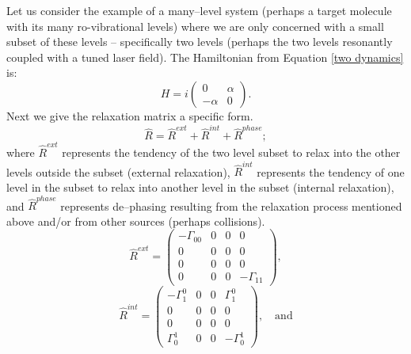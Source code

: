 Let us consider the example of a many--level system (perhaps a target molecule with its many ro-vibrational levels) where we are only concerned with a small subset of these levels -- specifically two levels (perhaps the two levels resonantly coupled with a tuned laser field). The Hamiltonian from Equation \ref{two dynamics} is:
\begin{equation}
H
=
i\left(
\begin{array}{cc}
0 & \alpha \\
-\alpha & 0
\end{array}
\right).
\label{Hilbert}
\end{equation}
Next we give the relaxation matrix a specific form.
\begin{equation}
\hat{R}
=
\hat{R}^{ext}
+
\hat{R}^{int}
+
\hat{R}^{phase};
\label{R}
\end{equation}
where $\hat{R}^{ext}$ represents the tendency of the two level subset to relax into the other levels outside the subset (external relaxation), $\hat{R}^{int}$ represents the tendency of one level in the subset to relax into another level in the subset (internal relaxation), and $\hat{R}^{phase}$ represents de--phasing resulting from the relaxation process mentioned above and/or from other sources (perhaps collisions).
\begin{equation}
\hat{R}^{ext}
=
\left(
\begin{array}{cccc}
-\Gamma_{00} & 0 & 0 & 0 \\
0 & 0 & 0 & 0 \\
0 & 0 & 0 & 0 \\
0 & 0 & 0 & -\Gamma_{11} 
\end{array}
\right),
\label{decay}
\end{equation}
\begin{equation}
\hat{R}^{int}
=
\left(
\begin{array}{cccc}
-\Gamma^{0}_{1} & 0 & 0 & \Gamma^{0}_{1}  \\
0 & 0 & 0 & 0 \\
0 & 0 & 0 & 0 \\
\Gamma^{1}_{0} & 0 & 0 & -\Gamma^{1}_{0} 
\end{array}
\right), \quad \mbox{and}
\label{exchange}
\end{equation}
